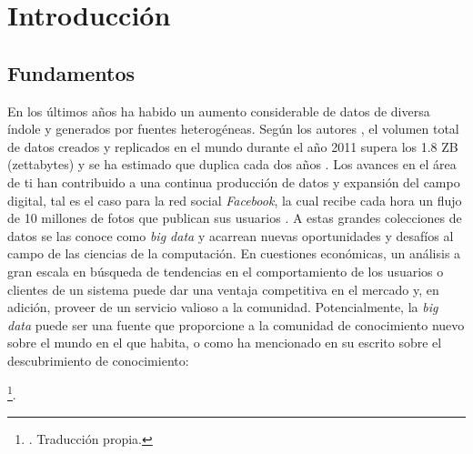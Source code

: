 \chapter{Introducción}

\section{Fundamentos}

En los últimos años ha habido un aumento considerable de datos de diversa índole
y generados por fuentes heterogéneas. Según los autores
\citeauthor{gantz_extracting_2011}, el volumen total de datos creados y
replicados en el mundo durante el año 2011 supera los 1.8 ZB (zettabytes) y se
ha estimado que duplica cada dos años \cite{gantz_extracting_2011}. Los avances
en el área de \acrfull{ti} han contribuido a una continua
producción de datos y expansión del campo digital, tal es el caso para la red
social \textit{Facebook}, la cual recibe cada hora un flujo de 10 millones de
fotos que publican sus usuarios \cite{mayer-schonberger_big_2013}. A estas
grandes colecciones de datos se las conoce como \textit{big data} y acarrean
nuevas oportunidades y desafíos al campo de las ciencias de la computación. En
cuestiones económicas, un análisis a gran escala en búsqueda de tendencias en el
comportamiento de los usuarios o clientes de un sistema puede dar una ventaja
competitiva en el mercado y, en adición, proveer de un servicio valioso a la
comunidad. Potencialmente, la \textit{big data} puede ser una fuente que
proporcione a la comunidad de conocimiento nuevo sobre el mundo en el que
habita, o como ha mencionado \citeauthor{fayyad_advances_1996} en su escrito
sobre el descubrimiento de conocimiento: 

\begin{displayquote}
    \footnote{ \cite[p. 2]{fayyad_advances_1996}. Traducción propia.}.
\end{displayquote}

